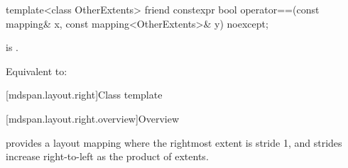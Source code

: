 %
\begin{itemdecl}
template<class OtherExtents>
  friend constexpr bool operator==(const mapping& x, const mapping<OtherExtents>& y) noexcept;
\end{itemdecl}

\begin{itemdescr}
\pnum
\constraints
{} is .

\pnum
\effects
Equivalent to: 
\end{itemdescr}

[mdspan.layout.right]{Class template }

[mdspan.layout.right.overview]{Overview}

\pnum
{} provides a layout mapping
where the rightmost extent is stride 1, and
strides increase right-to-left as the product of extents.

